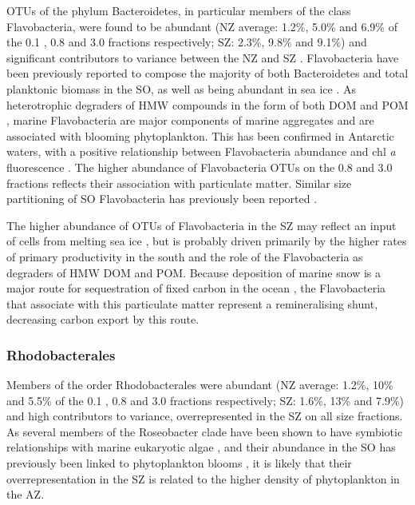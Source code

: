 \acp{OTU} of the phylum Bacteroidetes, in particular members of the class Flavobacteria, were found to be abundant (\ac{NZ} average: 1.2\%, 5.0\% and 6.9\% of the 0.1 \micron{}, 0.8 \micron{} and 3.0 \micron{} fractions respectively; SZ: 2.3\%, 9.8\% and 9.1\%) and significant contributors to variance between the \ac{NZ} and \ac{SZ} .
Flavobacteria have been previously reported to compose the majority of both Bacteroidetes \cite{Murray:2007db} and total planktonic biomass \cite{Abell:2005ji} in the \ac{SO}, as well as being abundant in sea ice \cite{Brown:2001hh}.
As heterotrophic degraders of \ac{HMW} compounds in the form of both \ac{DOM} and \ac{POM} \cite{Kirchman:2002ub}, marine Flavobacteria are major components of marine aggregates \cite{Rath:1998wm,Crump:1999wo,Zhang:2007fb} and are associated with blooming phytoplankton.
This has been confirmed in Antarctic waters, with a positive relationship between Flavobacteria abundance and chl \textit{a} fluorescence \cite{Williams:2012gsa}.
The higher abundance of Flavobacteria \acp{OTU} on the 0.8 \micron{} and 3.0 \micron{} fractions reflects their association with particulate matter.
Similar size partitioning of \ac{SO} Flavobacteria has previously been reported \cite{Abell:2005ji}.

The higher abundance of \acp{OTU} of Flavobacteria in the \ac{SZ} may reflect an input of cells from melting sea ice \cite{Brown:2001hh}, but is probably driven primarily by the higher rates of primary productivity in the south and the role of the Flavobacteria as degraders of \ac{HMW} \ac{DOM} and \ac{POM}.
Because deposition of marine snow is a major route for sequestration of fixed carbon in the ocean \citep[e.g.][]{Hessen:2004vq}, the Flavobacteria that associate with this particulate matter represent a remineralising shunt, decreasing carbon export by this route.

\subsubsection{Rhodobacterales}

Members of the order Rhodobacterales were abundant (\ac{NZ} average: 1.2\%, 10\% and 5.5\% of the 0.1 \micron{}, 0.8 \micron{} and 3.0 \micron{} fractions respectively; \ac{SZ}: 1.6\%, 13\% and 7.9\%) and high contributors to variance, overrepresented in the \ac{SZ} on all size fractions.
As several members of the Roseobacter clade have been shown to have symbiotic relationships with marine eukaryotic algae \cite{Buchan:2005hd,WagnerDobler:2006kb}, and their abundance in the \ac{SO} has previously been linked to phytoplankton blooms \cite{West:2008kc,Obernosterer:2011df}, it is likely that their overrepresentation in the \ac{SZ} is related to the higher density of phytoplankton in the \ac{AZ}.

